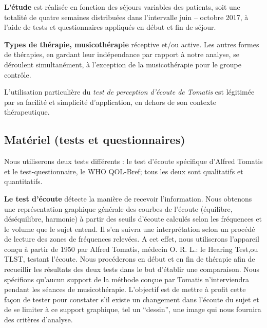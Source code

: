 \textbf{L'étude} est
réalisée en fonction des séjours variables des patients, soit une
totalité  de quatre semaines
distribuées dans l'intervalle juin --
octobre 2017,  à l'aide de tests et questionnaires appliqués en début
et fin de séjour.

\textbf{Types de thérapie, musicothérapie} réceptive et/ou active.
Les autres formes de thérapies, en gardant
leur indépendance par rapport à notre analyse, se déroulent simultanément, à
l'exception de la musicothérapie pour le groupe contrôle.

L'utilisation particulière du \textit{test de perception d'écoute de Tomatis}  est
légitimée par sa facilité et  simplicité d'application, en dehors de
son contexte thérapeutique.
\subsection{Matériel (tests et questionnaires)}
	Nous utiliserons deux tests différents : 
	le test d'écoute spécifique d'Alfred Tomatis
	et le test-questionnaire, le WHO QOL-Bref; tous les deux sont
        qualitatifs et quantitatifs.

        
        \textbf{Le test d'écoute} détecte la manière de recevoir
        l'information. Nous obtenons une  
	représentation graphique générale des courbes de l'écoute
        (équilibre, déséquilibre, harmonie) à partir des seuils d'écoute
        calculés selon les fréquences et le volume que le sujet entend. Il s'en suivra une interprétation
        selon un procédé de lecture des zones de fréquences relevées.
	A cet effet, nous utiliserons l'appareil conçu à partir de 1950 par Alfred Tomatis, médecin
        O. R. L.: le Hearing Test,ou TLST, testant
        l'écoute.
	Nous procéderons en début et en fin de thérapie
        afin de recueillir les résultats des
        deux tests dans le but d'établir une comparaison.
        Nous spécifions qu'aucun support de la méthode conçue par
        Tomatis n'interviendra pendant les séances de musicothérapie.
      L'objectif est de mettre à profit cette façon de  tester pour constater
      s'il existe un changement dans l'écoute du sujet et de
      se limiter à ce support graphique, tel un ``dessin'',
      une image qui nous fournira des critères d'analyse.
      
